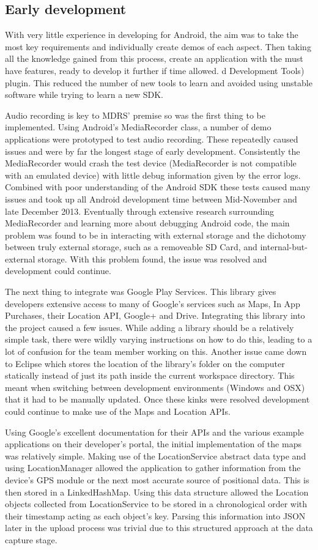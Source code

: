 \documentclass{l3proj}
\begin{document}
\subsection{Early development} With very little experience in developing for
Android, the aim was to take the most key requirements and individually create
demos of each aspect. Then taking all the knowledge gained from this process,
create an application with the must have features, ready to develop it further
if time allowed. d Development Tools) plugin. This reduced the number of new
tools to learn and avoided using unstable software while trying to learn a new
SDK.

Audio recording is key to MDRS' premise so was the first thing to be
implemented. Using Android's MediaRecorder class, a number of demo applications
were prototyped to test audio recording. These repeatedly caused issues and were
by far the longest stage of early development. Consistently the MediaRecorder
would crash the test device (MediaRecorder is not compatible with an emulated
device) with little debug information given by the error logs. Combined with
poor understanding of the Android SDK these tests caused many issues and took up
all Android development time between Mid-November and late December 2013.
Eventually through extensive research surrounding MediaRecorder and learning
more about debugging Android code, the main problem was found to be in
interacting with external storage and the dichotomy between truly external
storage, such as a removeable SD Card, and internal-but-external storage. With
this problem found, the issue was resolved and development could continue.

The next thing to integrate was Google Play Services. This library gives
developers extensive access to many of Google's services such as Maps, In App
Purchases, their Location API, Google+ and Drive. Integrating this library into
the project caused a few issues. While adding a library should be a relatively
simple task, there were wildly varying instructions on how to do this, leading
to a lot of confusion for the team member working on this. Another issue came
down to Eclipse which stores the location of the library's folder on the
computer statically instead of just its path inside the current workspace
directory. This meant when switching between development environments (Windows
and OSX) that it had to be manually updated. Once these kinks were resolved
development could continue to make use of the Maps and Location APIs.

Using Google's excellent documentation for their APIs and the various example
applications on their developer's portal, the initial implementation of the maps
was relatively simple. Making use of the LocationService abstract data type and
using LocationManager allowed the application to gather information from the
device's GPS module or the next most accurate source of positional data. This is
then stored in a LinkedHashMap. Using this data structure allowed the Location
objects collected from LocationService to be stored in a chronological order
with their timestamp acting as each object's key. Parsing this information into
JSON later in the upload process was trivial due to this structured approach at
the data capture stage.
\end{document}
